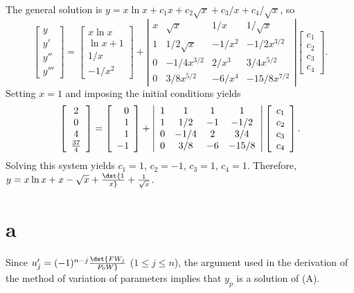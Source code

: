 \documentclass[dvips]{book}
\renewcommand{\exer}[1]{\par\medskip\;\noindent{\color{red}\bf #1.}}
\numberwithin{example}{section}
\numberwithin{equation}{section}
\numberwithin{theorem}{section}
\numberwithin{table}{section}
\numberwithin{figure}{section}
\begin{document}
The general solution is $y=x\ln x+c_1x+c_2\sqrt x+c_3/x+c_4/\sqrt x$,
so
$$
\left[\begin{array}{l}y\\y'\\y''\\y'''
\end{array}\right]=
\left[\begin{array}{c}
x\ln x\\\ln x+1\\1/x\\-1/x^2
\end{array}\right]+
\left|\begin{array}{cccc}
x&\sqrt{x}&1/x&1/\sqrt{x}\\
1&1/2\sqrt{x}&-1/x^2&-1/2x^{3/2}\\
0&-1/4x^{3/2}&2/x^3&3/4x^{5/2}\\
0&3/8x^{5/2}&-6/x^4&-15/8x^{7/2}
\end{array}\right|
\left[\begin{array}{c}
c_1\\c_2\\c_3\\c_4
\end{array}\right].
$$
Setting $x=1$ and imposing the initial conditions yields
$$
\left[\begin{array}{c}
2\\0\\4\\\-{37\over4}
\end{array}\right]=
\left[\begin{array}{r}
0\\1\\1\\-1
\end{array}\right]+
\left|\begin{array}{cccc}1&1&1&1\\1&1/2&-1&-1/2\\
0&-1/4&2&3/4\\0&3/8&-6&-15/8\end{array}\right|
\left[\begin{array}{c}
c_1\\c_2\\c_3\\c_4
\end{array}\right].
$$
Solving this system yields $c_1=1$, $c_2=-1$, $c_3=1$, $c_4=1$.
Therefore,  $y=x\ln x+x-\sqrt x+\dst{1\over x}+{1\over\sqrt x}$.


\exer{9.4.34}
\part{a}
Since
$u'_j=(-1)^{n-j}\dst{FW_j\over P_0W}$  ($1\le j\le n$), the argument
used in the derivation of the method of variation of parameters
implies that $y_p$ is a solution of (A).
\end{document}
